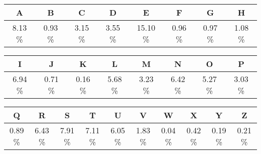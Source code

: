 \documentclass[paper=a4, fontsize=11pt]{scrartcl} %
\numberwithin{equation}{section} %
\numberwithin{figure}{section} %
\numberwithin{table}{section} %
\begin{document}
	\begin{center}
		\begin{tabular}{c|c|c|c|c|c|c|c}
			A & B & C & D & E & F & G & H \\ \hline
			8.13 \% & 0.93 \% & 3.15 \% & 3.55 \% & 15.10 \% & 0.96 \% & 0.97 \% & 1.08 \% 
		\end{tabular} 
	\end{center}
	
	\begin{center}
		\begin{tabular}{c|c|c|c|c|c|c|c}
			I & J & K & L & M & N & O & P \\ \hline
			6.94 \% & 0.71 \% & 0.16 \% & 5.68 \% & 3.23 \% & 6.42 \% & 5.27 \% & 3.03 \% 
		\end{tabular}
	\end{center}
	
	\begin{center}
		\begin{tabular}{c|c|c|c|c|c|c|c|c|c}
			 Q & R & S & T & U & V & W & X & Y & Z  \\ \hline
			 0.89 \% & 6.43 \% & 7.91 \% & 7.11 \% & 6.05 \% & 1.83 \% & 0.04 \% & 0.42 \% & 0.19 \% & 0.21 \%
		\end{tabular}
	\end{center}
	
\end{document}

